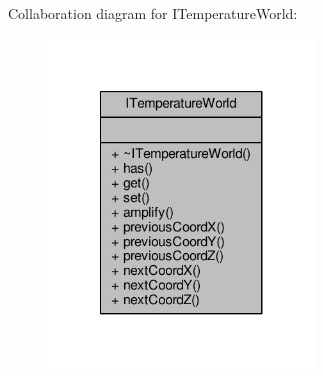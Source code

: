 Collaboration diagram for I\-Temperature\-World\-:
\nopagebreak
\begin{figure}[H]
\begin{center}
\leavevmode
\includegraphics[width=200pt]{class_i_temperature_world__coll__graph}
\end{center}
\end{figure}

